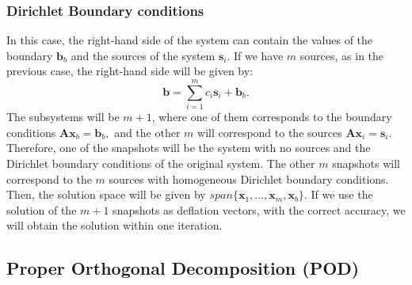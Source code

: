 \documentclass[12pt]{article}
\numberwithin{equation}{section}
\begin{document}
\subsubsection*{{Dirichlet Boundary conditions}}
In this case, the right-hand side of the system can contain the values of the boundary $\mathbf{b}_b$ and the sources of the system $\mathbf{s}_i$. 
If we have $m$ sources, as in the previous case, the right-hand side will be given by:
$$\mathbf{b}=\sum_{i=1}^{m} {c}_i\mathbf{s}_i+\mathbf{b}_b.$$
The subsystems will be $m+1$, where one of them corresponds to the boundary conditions
 $\mathbf{A}\mathbf{x}_b=\mathbf{b}_b,$
 and the other $m$ will correspond to the sources
$\mathbf{A}\mathbf{x}_i=\mathbf{s}_i.$
Therefore, one of the snapshots will be the system with no sources and the Dirichlet boundary conditions of the original system. The other $m$ snapshots will correspond to the $m$ sources with homogeneous Dirichlet boundary conditions. Then, the solution space will be given by $ span\{\mathbf{x}_1,...,\mathbf{x}_{m},\mathbf{x}_b\}$.
If we use the solution of the $m+1$ snapshots as deflation vectors, with the correct accuracy, we will obtain the solution within one iteration.
\subsection{Proper Orthogonal Decomposition (POD)}\label{POD}
\end{document}
